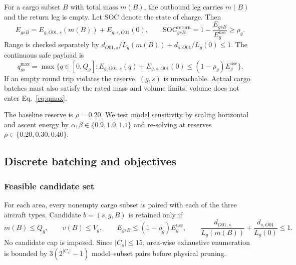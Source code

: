 \documentclass[11pt,a4paper]{article}
\newcommand{\SOC}{\mathrm{SOC}}
\begin{document}
For a cargo subset $B$ with total mass $m(B)$, the outbound leg carries $m(B)$ and the return leg is empty. Let $\SOC$ denote the state of charge. Then
\begin{equation}
E_{gsB}=E_{g,O01,s}(m(B))+E_{g,s,O01}(0),\qquad
\SOC^{\mathrm{return}}_{gsB}=1-\frac{E_{gsB}}{E_g^{\mathrm{use}}}\ge \rho_g.
\label{eq:roundtrip}
\end{equation}
Range is checked separately by $d_{O01,s}/L_g(m(B))+d_{s,O01}/L_g(0)\le1$. The continuous safe payload is
\begin{equation}
q^{\max}_{gs}=\max\{q\in[0,Q_g]: E_{g,O01,s}(q)+E_{g,s,O01}(0)\le(1-\rho_g)E_g^{\mathrm{use}}\}.
\label{eq:qmax}
\end{equation}
If an empty round trip violates the reserve, $(g,s)$ is unreachable. Actual cargo batches must also satisfy the rated mass and volume limits; volume does not enter Eq.~\eqref{eq:qmax}.

The baseline reserve is $\rho=0.20$. We test model sensitivity by scaling horizontal and ascent energy by $\alpha,\beta\in\{0.9,1.0,1.1\}$ and re-solving at reserves $\rho\in\{0.20,0.30,0.40\}$. 

\subsection{Discrete batching and objectives}
\subsubsection{Feasible candidate set}
For each area, every nonempty cargo subset is paired with each of the three aircraft types. Candidate $b=(s,g,B)$ is retained only if
\begin{equation}
m(B)\le Q_g,\qquad v(B)\le V_g,\qquad
E_{gsB}\le(1-\rho_g)E_g^{\mathrm{use}},\qquad
\frac{d_{O01,s}}{L_g(m(B))}+\frac{d_{s,O01}}{L_g(0)}\le1.
\label{eq:candidate}
\end{equation}
No candidate cap is imposed. Since $|C_s|\le15$, area-wise exhaustive enumeration is bounded by $3(2^{|C_s|}-1)$ model--subset pairs before physical pruning.
\end{document}
